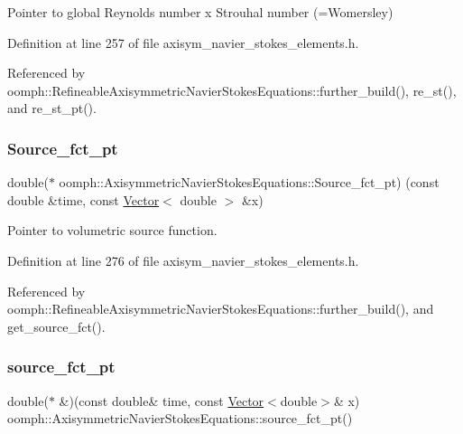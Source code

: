 Pointer to global Reynolds number x Strouhal number (=Womersley) 



Definition at line 257 of file axisym\+\_\+navier\+\_\+stokes\+\_\+elements.\+h.



Referenced by oomph\+::\+Refineable\+Axisymmetric\+Navier\+Stokes\+Equations\+::further\+\_\+build(), re\+\_\+st(), and re\+\_\+st\+\_\+pt().

\mbox{\label{classoomph_1_1AxisymmetricNavierStokesEquations_a147fe7513792db73d175d5100808903c}} 
\subsubsection{\texorpdfstring{Source\+\_\+fct\+\_\+pt}{Source\_fct\_pt}}
{\footnotesize\ttfamily double($\ast$ oomph\+::\+Axisymmetric\+Navier\+Stokes\+Equations\+::\+Source\+\_\+fct\+\_\+pt) (const double \&time, const \hyperlink{classoomph_1_1Vector}{Vector}$<$ double $>$ \&x)\hspace{0.3cm}{\ttfamily [protected]}}



Pointer to volumetric source function. 



Definition at line 276 of file axisym\+\_\+navier\+\_\+stokes\+\_\+elements.\+h.



Referenced by oomph\+::\+Refineable\+Axisymmetric\+Navier\+Stokes\+Equations\+::further\+\_\+build(), and get\+\_\+source\+\_\+fct().

\mbox{\label{classoomph_1_1AxisymmetricNavierStokesEquations_a08d61d929d288c3584ebcab183ec68cc}} 
\subsubsection{\texorpdfstring{source\+\_\+fct\+\_\+pt}{source\_fct\_pt}}
{\footnotesize\ttfamily double($\ast$ \&)(const double\& time, const \hyperlink{classoomph_1_1Vector}{Vector}$<$double$>$\& x) oomph\+::\+Axisymmetric\+Navier\+Stokes\+Equations\+::source\+\_\+fct\+\_\+pt()\hspace{0.3cm}{\ttfamily [inline]}}



